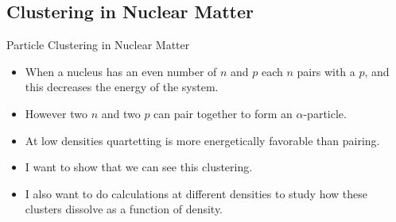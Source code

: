 \documentclass{beamer}
\begin{document}
\subsection{Clustering in Nuclear Matter}
\begin{frame}{Particle Clustering in Nuclear Matter}
\begin{itemize}
   \item When a nucleus has an even number of $n$ and $p$ each $n$ pairs with a $p$, and this decreases the energy of the system.
   \item However two $n$ and two $p$ can pair together to form an $\alpha$-particle.
   \item At low densities quartetting is more energetically favorable than pairing.
   \item I want to show that we can see this clustering.
   \item I also want to do calculations at different densities to study how these clusters dissolve as a function of density.
\end{itemize}
\end{frame}
\end{document}
